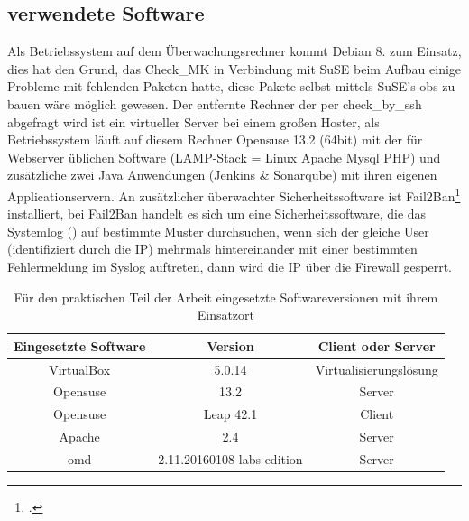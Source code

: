 \documentclass[12pt,a4paper,parskip,listof=totoc,bibliography=totoc]{scrreprt}
\begin{document}
	\subsection{verwendete Software}
	Als Betriebssystem auf dem Überwachungsrechner kommt Debian 8. zum Einsatz, dies hat den Grund, das Check\_MK in Verbindung mit SuSE beim Aufbau einige Probleme mit fehlenden Paketen hatte, diese Pakete selbst mittels SuSE's \acrfull{obs} zu bauen wäre möglich gewesen.
	 Der entfernte Rechner der per check\_by\_ssh abgefragt wird ist ein virtueller Server bei einem großen Hoster, als Betriebssystem läuft auf diesem Rechner Opensuse 13.2 (64bit) mit der für Webserver üblichen Software (LAMP-Stack = Linux Apache Mysql PHP) und zusätzliche zwei Java Anwendungen (Jenkins \& Sonarqube) mit ihren eigenen Applicationservern. An zusätzlicher überwachter Sicherheitssoftware ist Fail2Ban\footcite{fail2ban} installiert, bei Fail2Ban handelt es sich um eine Sicherheitssoftware, die das Systemlog () auf bestimmte Muster durchsuchen, wenn sich der gleiche User (identifiziert durch die IP) mehrmals hintereinander mit einer bestimmten Fehlermeldung im Syslog auftreten, dann wird die IP über die Firewall gesperrt. \\
	\begin{table}[h] %
	\begin{center}
	\begin{tabular}{|c|c|c|}
	\hline 
	Eingesetzte Software & Version & Client oder Server \\ 
	\hline 
	VirtualBox & 5.0.14 & Virtualisierungslösung\\
	\hline
	Opensuse & 13.2 & Server\\ 
	\hline 
	Opensuse & Leap 42.1 & Client\\
	\hline
	Apache & 2.4 & Server\\
	\hline
	\acrshort{omd} & 2.11.20160108-labs-edition & Server\\
	\hline
	\end{tabular} 
	\caption[Eingesetzte Softwareversionen]{Für den praktischen Teil der Arbeit eingesetzte Softwareversionen mit ihrem Einsatzort}
	\end{center}
	\end{table}
\end{document}
